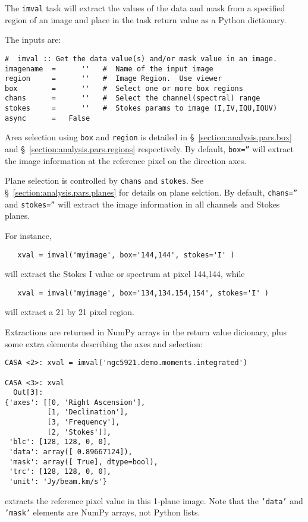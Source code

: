 The {\tt imval} task will extract the values of the data and mask
from a specified region of an image and place in the task return
value as a Python dictionary.

The inputs are:
\small
\begin{verbatim}
#  imval :: Get the data value(s) and/or mask value in an image.
imagename  =      ''   #  Name of the input image
region     =      ''   #  Image Region.  Use viewer
box        =      ''   #  Select one or more box regions
chans      =      ''   #  Select the channel(spectral) range
stokes     =      ''   #  Stokes params to image (I,IV,IQU,IQUV)
async      =   False       
\end{verbatim}
\normalsize

Area selection using {\tt box} and {\tt region} is detailed in 
\S~\ref{section:analysis.pars.box} and
\S~\ref{section:analysis.pars.regions} respectively.
By default, {\tt box=''} will
extract the image information at the reference pixel on the
direction axes.

Plane selection is controlled by {\tt chans} and {\tt stokes}.
See \S~\ref{section:analysis.pars.planes} for details on plane
selction.  By default, {\tt chans=''} and {\tt stokes=''} will
extract the image information in all channels and Stokes planes.

For instance,
\small
\begin{verbatim}
   xval = imval('myimage', box='144,144', stokes='I' )
\end{verbatim}
\normalsize
will extract the Stokes I value or spectrum at pixel 144,144, while
\small
\begin{verbatim}
   xval = imval('myimage', box='134,134.154,154', stokes='I' )
\end{verbatim}
\normalsize
will extract a 21 by 21 pixel region.

Extractions are returned in NumPy arrays in the return value
dicionary, plus some extra elements describing the axes and selection:
\small
\begin{verbatim}
CASA <2>: xval = imval('ngc5921.demo.moments.integrated')

CASA <3>: xval
  Out[3]: 
{'axes': [[0, 'Right Ascension'],
          [1, 'Declination'],
          [3, 'Frequency'],
          [2, 'Stokes']],
 'blc': [128, 128, 0, 0],
 'data': array([ 0.89667124]),
 'mask': array([ True], dtype=bool),
 'trc': [128, 128, 0, 0],
 'unit': 'Jy/beam.km/s'}
\end{verbatim}
\normalsize
extracts the reference pixel value in this 1-plane image.  Note that
the {\tt 'data'} and {\tt 'mask'} elements are NumPy arrays, not 
Python lists.

